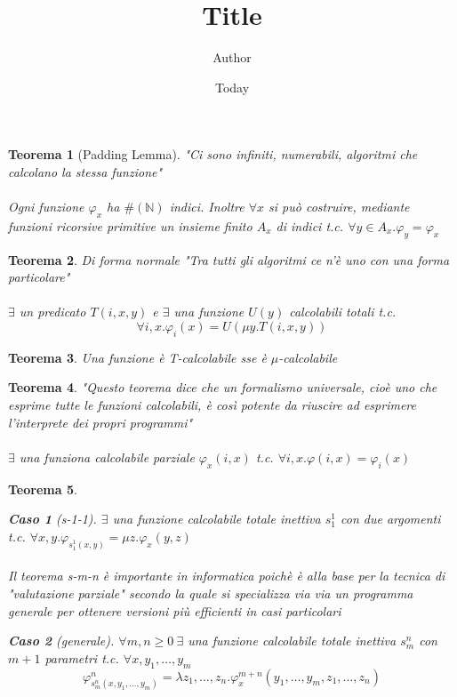 \documentclass[]{article}
\begin{document}
\newcommand{\campo}[1]{\mathbb{#1}}
\newtheorem{teo}{Teorema}
\newtheorem{case}{Caso}
\newtheorem{itdef}{Definizione}
\newtheorem{prop}{Proprietà}
\title{Title}
\author{Author}
\date{Today}
\maketitle

\begin{teo}[Padding Lemma] 
"Ci sono infiniti, numerabili, algoritmi che calcolano la stessa funzione"\\\\
Ogni funzione $\varphi_x$ ha $\#(\campo{N})$ indici. Inoltre $\forall x$ si può costruire, mediante funzioni ricorsive primitive un insieme finito $A_x$ di indici t.c. $\forall y \in A_x . \varphi_y = \varphi_x$
\end{teo}

\begin{teo}{Di forma normale}
"Tra tutti gli algoritmi ce n'è uno con una forma particolare"\\\\
$\exists$ un predicato $T(i,x,y)$ e $\exists$ una funzione $U(y)$ calcolabili totali t.c. $$\forall i, x . \varphi_i(x)=U(\mu y.T(i,x,y))$$
\end{teo}

\begin{teo}
Una funzione è T-calcolabile sse è $\mu$-calcolabile
\end{teo}

\begin{teo}
"Questo teorema dice che un formalismo universale, cioè uno che esprime tutte le funzioni calcolabili, è così potente da riuscire ad esprimere l'interprete dei propri programmi"
\\\\
$\exists$ una funziona calcolabile parziale $\varphi_x(i,x)$ t.c. $\forall i,x . \varphi(i,x)=\varphi_i(x)$
\end{teo}

\begin{teo} \ \
\begin{case}[s-1-1]
$\exists$ una funzione calcolabile totale inettiva $s_1^1$ con due argomenti t.c. $\forall x,y . \varphi_{s_1^1(x,y)}=\mu z . \varphi_x(y,z)$
\\ \\
Il teorema s-m-n è importante in informatica poichè è alla base per la tecnica di "valutazione parziale" secondo la quale si specializza via via un programma generale per ottenere versioni più efficienti in casi particolari
\end{case}
\begin{case}[generale]
$\forall m,n \ge 0\ \exists$ una funzione calcolabile totale inettiva $s_m^n$ con $m+1$ parametri t.c. $\forall x, y_1, \dots, y_m$ 
$$\varphi^n_{s_m^n(x, y_1, \dots, y_m)}=\lambda z_1, \dots, z_n . \varphi_x^{m+n}(y_1, \dots, y_m, z_1, \dots, z_n)$$
\end{case}
\end{teo}
\end{document}
